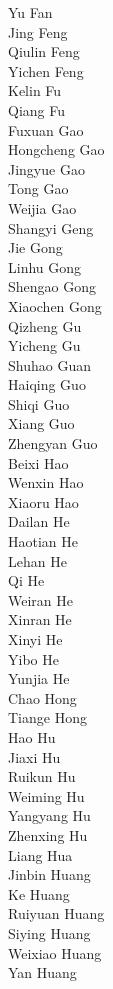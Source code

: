 Yu Fan\\
Jing Feng\\
Qiulin Feng\\
Yichen Feng\\
Kelin Fu\\
Qiang Fu\\
Fuxuan Gao\\
Hongcheng Gao\\
Jingyue Gao\\
Tong Gao\\
Weijia Gao\\
Shangyi Geng\\
Jie Gong\\
Linhu Gong\\
Shengao Gong\\
Xiaochen Gong\\
Qizheng Gu\\
Yicheng Gu\\
Shuhao Guan\\
Haiqing Guo\\
Shiqi Guo\\
Xiang Guo\\
Zhengyan Guo\\
Beixi Hao\\
Wenxin Hao\\
Xiaoru Hao\\
Dailan He\\
Haotian He\\
Lehan He\\
Qi He\\
Weiran He\\
Xinran He\\
Xinyi He\\
Yibo He\\
Yunjia He\\
Chao Hong\\
Tiange Hong\\
Hao Hu\\
Jiaxi Hu\\
Ruikun Hu\\
Weiming Hu\\
Yangyang Hu\\
Zhenxing Hu\\
Liang Hua\\
Jinbin Huang\\
Ke Huang\\
Ruiyuan Huang\\
Siying Huang\\
Weixiao Huang\\
Yan Huang\\
